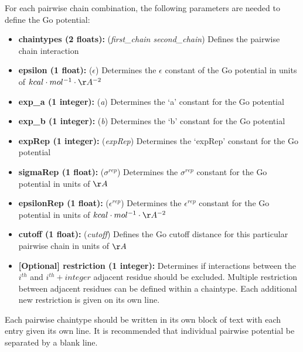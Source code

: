For each pairwise chain combination, the following parameters are needed to define the Go potential:
\begin{itemize}
\item{\textbf{chaintypes (2 floats):}}
 (\textit{first\_chain second\_chain}) Defines the pairwise chain interaction
\item{\textbf{epsilon (1 float):}}
 (\textit{$\epsilon$}) Determines the $\epsilon$ constant of the Go potential in units of $kcal \cdot mol^{-1} \cdot \AA^{-2}$ 
\item{\textbf{exp\_a (1 integer):}}
 (\textit{a}) Determines the `a' constant for the Go potential 
\item{\textbf{exp\_b (1 integer):}}
 (\textit{b}) Determines the `b' constant for the Go potential 
\item{\textbf{expRep (1 integer):}}
 (\textit{expRep}) Determines the `expRep' constant for the Go potential 
\item{\textbf{sigmaRep (1 float):}}
 (\textit{$\sigma^{rep}$}) Determines the $\sigma^{rep}$ constant for the Go potential in units of $\AA$ 
\item{\textbf{epsilonRep (1 float):}}
 (\textit{$\epsilon^{rep}$}) Determines the $\epsilon^{rep}$ constant for the Go potential in units of $kcal \cdot mol^{-1} \cdot \AA^{-2}$ 
\item{\textbf{cutoff (1 float):}}
 (\textit{cutoff}) Defines the Go cutoff distance for this particular pairwise chain in units of $\AA$
\item{\textbf{[Optional] restriction (1 integer):}}
 Determines if interactions between the $i^{th}$ and $i^{th} + \textit{integer}$
 adjacent residue should be excluded.  Multiple restriction between adjacent residues can be defined within a chaintype.
Each additional new restriction is given on its own line.
\end{itemize}

Each pairwise chaintype should be written in its own block of text with each entry given its own line.  
It is recommended that individual pairwise potential be separated by a blank line.
